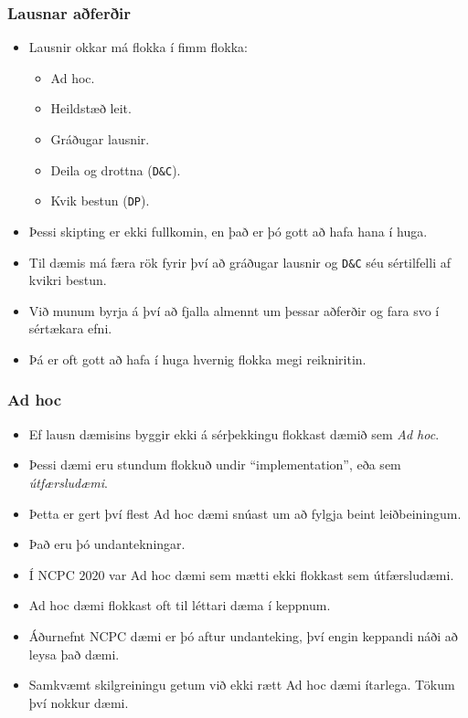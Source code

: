 \documentclass[handout]{beamer}
\newcommand\env[2]
{
	\begin{#1}
	#2
	\end{#1}
}
\begin{document}
\env{frame}
{
	\frametitle{Lausnar aðferðir}
	\env{itemize}
	{
		\item<1-> Lausnir okkar má flokka í fimm flokka:
		\env{itemize}
		{
			\item<2-> Ad hoc.
			\item<3-> Heildstæð leit.
			\item<4-> Gráðugar lausnir.
			\item<5-> Deila og drottna (\texttt{D\&C}).
			\item<6-> Kvik bestun (\texttt{DP}).
		}
		\item<7-> Þessi skipting er ekki fullkomin, en það er þó gott að hafa hana í huga.
		\item<8-> Til dæmis má færa rök fyrir því að gráðugar lausnir og \texttt{D\&C} séu sértilfelli af kvikri bestun.
		\item<9-> Við munum byrja á því að fjalla almennt um þessar aðferðir og fara svo í sértækara efni.
		\item<10-> Þá er oft gott að hafa í huga hvernig flokka megi reikniritin.
	}
}

\env{frame}
{
	\frametitle{Ad hoc}
	\env{itemize}
	{
		\item<1-> Ef lausn dæmisins byggir ekki á sérþekkingu flokkast dæmið sem \emph{Ad hoc}.
		\item<2-> Þessi dæmi eru stundum flokkuð undir ``implementation'', eða sem \emph{útfærsludæmi}.
		\item<3-> Þetta er gert því flest Ad hoc dæmi snúast um að fylgja beint leiðbeiningum.
		\item<4-> Það eru þó undantekningar.
		\item<5-> Í NCPC $2020$ var Ad hoc dæmi sem mætti ekki flokkast sem útfærsludæmi.
		\item<6-> Ad hoc dæmi flokkast oft til léttari dæma í keppnum.
		\item<7-> Áðurnefnt NCPC dæmi er þó aftur undanteking, því engin keppandi náði að leysa það dæmi.
		\item<8-> Samkvæmt skilgreiningu getum við ekki rætt Ad hoc dæmi ítarlega. Tökum því nokkur dæmi.
	}
}
\end{document}
